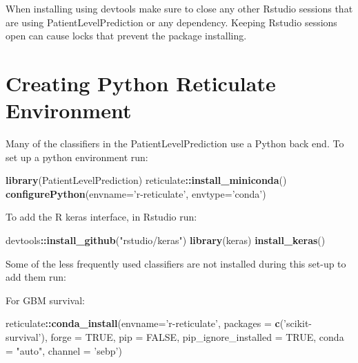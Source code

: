 \documentclass[
]{article}
\newenvironment{Shaded}{\begin{snugshade}}{\end{snugshade}}
\newcommand{\DataTypeTok}[1]{\textcolor[rgb]{0.13,0.29,0.53}{#1}}
\newcommand{\KeywordTok}[1]{\textcolor[rgb]{0.13,0.29,0.53}{\textbf{#1}}}
\newcommand{\NormalTok}[1]{#1}
\newcommand{\OperatorTok}[1]{\textcolor[rgb]{0.81,0.36,0.00}{\textbf{#1}}}
\newcommand{\OtherTok}[1]{\textcolor[rgb]{0.56,0.35,0.01}{#1}}
\newcommand{\StringTok}[1]{\textcolor[rgb]{0.31,0.60,0.02}{#1}}
\begin{document}
When installing using devtools make sure to close any other Rstudio
sessions that are using PatientLevelPrediction or any dependency.
Keeping Rstudio sessions open can cause locks that prevent the package
installing.

\hypertarget{creating-python-reticulate-environment}{%
\section{Creating Python Reticulate
Environment}\label{creating-python-reticulate-environment}}

Many of the classifiers in the PatientLevelPrediction use a Python back
end. To set up a python environment run:

\begin{Shaded}
\begin{Highlighting}[]
\KeywordTok{library}\NormalTok{(PatientLevelPrediction)}
\NormalTok{reticulate}\OperatorTok{::}\KeywordTok{install_miniconda}\NormalTok{()}
\KeywordTok{configurePython}\NormalTok{(}\DataTypeTok{envname=}\StringTok{'r-reticulate'}\NormalTok{, }\DataTypeTok{envtype=}\StringTok{'conda'}\NormalTok{)}
\end{Highlighting}
\end{Shaded}

To add the R keras interface, in Rstudio run:

\begin{Shaded}
\begin{Highlighting}[]
\NormalTok{devtools}\OperatorTok{::}\KeywordTok{install_github}\NormalTok{(}\StringTok{"rstudio/keras"}\NormalTok{)}
\KeywordTok{library}\NormalTok{(keras)}
\KeywordTok{install_keras}\NormalTok{()}
\end{Highlighting}
\end{Shaded}

Some of the less frequently used classifiers are not installed during
this set-up to add them run:

For GBM survival:

\begin{Shaded}
\begin{Highlighting}[]
\NormalTok{reticulate}\OperatorTok{::}\KeywordTok{conda_install}\NormalTok{(}\DataTypeTok{envname=}\StringTok{'r-reticulate'}\NormalTok{, }\DataTypeTok{packages =} \KeywordTok{c}\NormalTok{(}\StringTok{'scikit-survival'}\NormalTok{), }\DataTypeTok{forge =} \OtherTok{TRUE}\NormalTok{, }\DataTypeTok{pip =} \OtherTok{FALSE}\NormalTok{, }\DataTypeTok{pip_ignore_installed =} \OtherTok{TRUE}\NormalTok{, }\DataTypeTok{conda =} \StringTok{"auto"}\NormalTok{, }\DataTypeTok{channel =} \StringTok{'sebp'}\NormalTok{)}
\end{Highlighting}
\end{Shaded}
\end{document}
